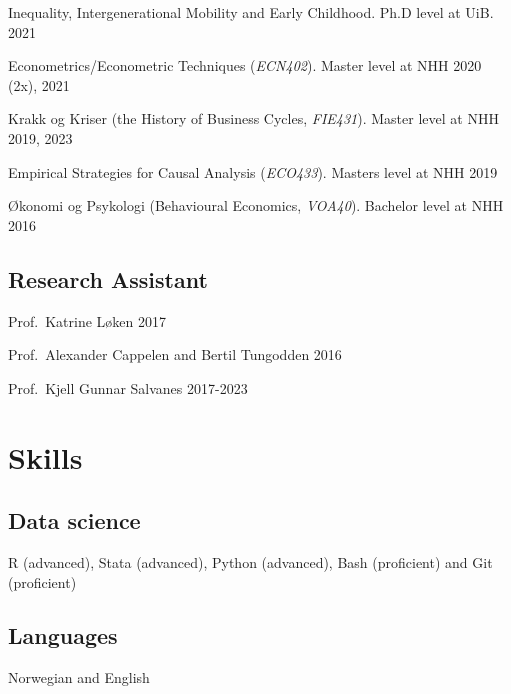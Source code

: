 \documentclass[11pt,]{article}
\begin{document}
Inequality, Intergenerational Mobility and Early Childhood. Ph.D level
at UiB. \hfill 2021\vspace{-0.2cm}

Econometrics/Econometric Techniques (\emph{ECN402}). Master level at NHH
\hfill 2020 (2x), 2021\vspace{-0.2cm}

Krakk og Kriser (the History of Business Cycles, \emph{FIE431}). Master
level at NHH \hfill 2019, 2023\vspace{-0.2cm}

Empirical Strategies for Causal Analysis (\emph{ECO433}). Masters level
at NHH \hfill 2019\vspace{-0.2cm}

Økonomi og Psykologi (Behavioural Economics, \emph{VOA40}). Bachelor
level at NHH \hfill 2016\vspace{-0.2cm}

\vspace{0.5cm}

\hypertarget{research-assistant}{%
\subsection{Research Assistant}\label{research-assistant}}

Prof.~Katrine Løken \hfill 2017\vspace{-0.2cm}

Prof.~Alexander Cappelen and Bertil Tungodden \hfill 2016\vspace{-0.2cm}

Prof.~Kjell Gunnar Salvanes \hfill 2017-2023\vspace{-0.2cm}

\vspace{0.5cm}

\hypertarget{skills}{%
\section{Skills}\label{skills}}

\hypertarget{data-science}{%
\subsection{Data science}\label{data-science}}

R (advanced), Stata (advanced), Python (advanced), Bash (proficient) and
Git (proficient)\vspace{-0.2cm}

\vspace{0.5cm}

\vspace{-0.3cm}

\hypertarget{languages}{%
\subsection{Languages}\label{languages}}

Norwegian and English\vspace{-0.2cm}

\vspace{0.5cm}
\end{document}
